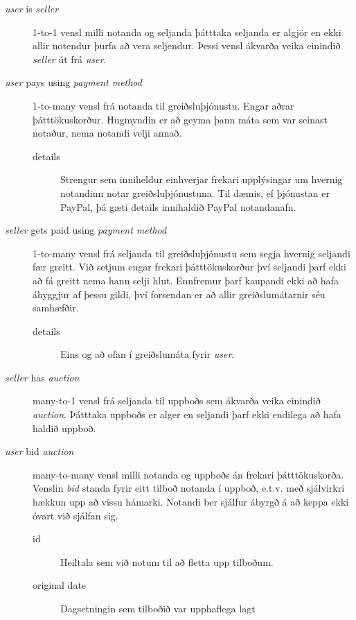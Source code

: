\documentclass[a4paper,icelandic]{article}
\theoremstyle{definition} \newtheorem{skilgr}{Skilgreining}
\theoremstyle{plain}      \newtheorem{setn}{Setning}
\theoremstyle{remark}     \newtheorem*{lausn}{Lausn}
\begin{document}
\begin{description}
    \item[\emph{user} is \emph{seller}] 1-to-1 vensl milli notanda og seljanda
        þátttaka seljanda er algjör en ekki allir notendur þurfa að vera
        seljendur. Þessi vensl ákvarða veika einindið \emph{seller} út frá
        \emph{user}.
    \item[\emph{user} pays using \emph{payment method}] 1-to-many vensl frá
        notanda til greiðsluþjónustu. Engar aðrar þátttökuskorður. 
        Hugmyndin er að geyma þann máta sem var seinast notaður, nema notandi
        velji annað.
        \begin{description}
            \item[details] Strengur sem inniheldur einhverjar frekari
                upplýsingar um hvernig notandinn notar greiðsluþjónustuna. Til
                dæmis, ef þjónustan er PayPal, þá gæti details innihaldið
                PayPal notandanafn.
        \end{description}
    \item[\emph{seller} gets paid using \emph{payment method}] 1-to-many vensl
        frá seljanda til greiðsluþjónustu sem segja hvernig seljandi fær 
        greitt. Við setjum engar frekari þátttökuskorður því seljandi þarf ekki
        að fá greitt nema hann selji hlut. Ennfremur þarf kaupandi ekki að hafa
        áhyggjur af þessu gildi, því forsendan er að allir greiðslumátarnir séu
        samhæfðir.
        \begin{description}
            \item[details] Eins og að ofan í greiðslumáta fyrir \emph{user}.
        \end{description}
    \item[\emph{seller} has \emph{auction}] many-to-1 vensl frá seljanda til
        uppboðs sem ákvarða veika einindið \emph{auction}. Þátttaka uppboðs er
        alger en seljandi þarf ekki endilega að hafa haldið uppboð.
    \item[\emph{user} bid \emph{auction}] many-to-many vensl milli notanda og
        uppboðs án frekari þátttökuskorða. Venslin \emph{bid} standa fyrir eitt
        tilboð notanda í uppboð, e.t.v. með sjálvirkri hækkun upp að vissu
        hámarki. Notandi ber sjálfur ábyrgð á að keppa ekki óvart við sjálfan
        sig.
        \begin{description}
            \item[id] Heiltala sem við notum til að fletta upp tilboðum.
            \item[original date] Dagsetningin sem tilboðið var upphaflega lagt

\end{description}
\end{description}
\end{document}
